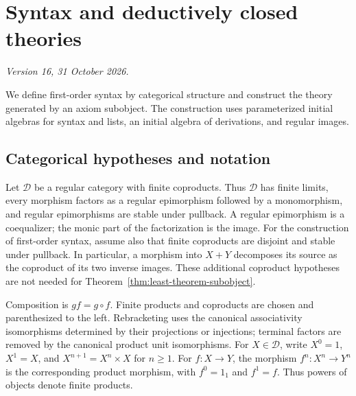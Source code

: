 \documentclass[11pt]{article}
\theoremstyle{definition}\newtheorem{definition}[theorem]{Definition}
\begin{document}
\appendix
\section{Syntax and deductively closed theories}
\label{app:syntax-theories}
\noindent\textit{Version 16, 31 October 2026.}\par\medskip

We define first-order syntax by categorical structure and construct
the theory generated by an axiom subobject. The construction uses
parameterized initial algebras for syntax and lists, an initial algebra
of derivations, and regular images.

\subsection{Categorical hypotheses and notation}
\label{app:categorical-hypotheses}

Let $\mathcal D$ be a regular category with finite coproducts.
Thus $\mathcal D$ has finite limits, every morphism factors as a
regular epimorphism followed by a monomorphism, and regular
epimorphisms are stable under pullback. A regular epimorphism is a
coequalizer; the monic part of the factorization is the image.
For the construction of first-order syntax, assume also that finite
coproducts are disjoint and stable under pullback. In particular,
a morphism into $X+Y$ decomposes its source as the coproduct of its
two inverse images. These additional coproduct hypotheses are not
needed for Theorem~\ref{thm:least-theorem-subobject}.

Composition is $gf=g\circ f$. Finite products and coproducts are
chosen and parenthesized to the left. Rebracketing uses the canonical
associativity isomorphisms determined by their projections or injections;
terminal factors are removed by the canonical product unit isomorphisms.
For $X\in\mathcal D$, write $X^0=1$, $X^1=X$, and
$X^{n+1}=X^n\times X$ for $n\geq1$.
For $f:X\to Y$, the morphism $f^n:X^n\to Y^n$ is the corresponding
product morphism, with $f^0=1_1$ and $f^1=f$.
Thus powers of objects denote finite products.
\end{document}

